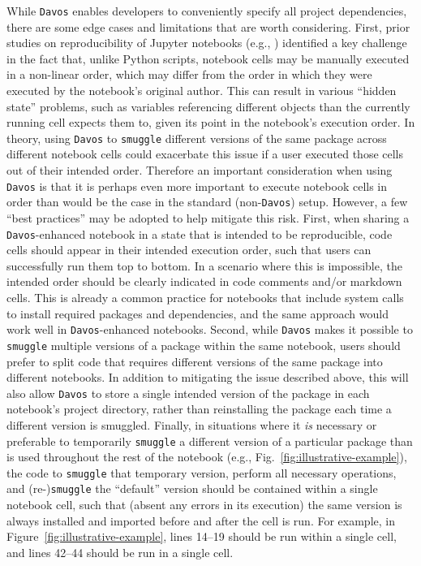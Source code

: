 \documentclass[preprint,12pt,a4paper]{elsarticle}
\begin{document}
While \texttt{Davos} enables developers to conveniently specify all project
dependencies, there are some edge cases and limitations that are worth
considering.
First, prior studies on reproducibility of Jupyter notebooks (e.g., \cite{PimeEtal19}) identified a key challenge in the fact that, unlike Python scripts, notebook cells may be manually executed in a non-linear order, which may differ from the order in which they were executed by the notebook's original author.
This can result in various ``hidden state'' problems, such as variables referencing different objects than the currently running cell expects them to, given its point in the notebook's execution order.
In theory, using \texttt{Davos} to \texttt{smuggle} different versions of the same package across different notebook cells could exacerbate this issue if a user executed those cells out of their intended order.
Therefore an important consideration when using \texttt{Davos} is that it is perhaps even more important to execute notebook cells in order than would be the case in the standard (non-\texttt{Davos}) setup.
However, a few ``best practices'' may be adopted to help mitigate this risk.
First, when sharing a \texttt{Davos}-enhanced notebook in a state that is intended to be reproducible, code cells should appear in their intended execution order, such that users can successfully run them top to bottom.
In a scenario where this is impossible, the intended order should be clearly indicated in code comments and/or markdown cells.
This is already a common practice for notebooks that include system calls to install required packages and dependencies, and the same approach would work well in \texttt{Davos}-enhanced notebooks.
Second, while \texttt{Davos} makes it possible to \texttt{smuggle} multiple versions of a package within the same notebook, users should prefer to split code that requires different versions of the same package into different notebooks.
In addition to mitigating the issue described above, this will also allow \texttt{Davos} to store a single intended version of the package in each notebook's project directory, rather than reinstalling the package each time a different version is smuggled.
Finally, in situations where it \textit{is} necessary or preferable to temporarily \texttt{smuggle} a different version of a particular package than is used throughout the rest of the notebook (e.g., Fig.~\ref{fig:illustrative-example}), the code to \texttt{smuggle} that temporary version, perform all necessary operations, and (re-)\texttt{smuggle} the ``default'' version should be contained within a single notebook cell, such that (absent any errors in its execution) the same version is always installed and imported before and after the cell is run.
For example, in Figure~\ref{fig:illustrative-example}, lines 14--19 should be run within a single cell, and lines 42--44 should be run in a single cell.
\end{document}
